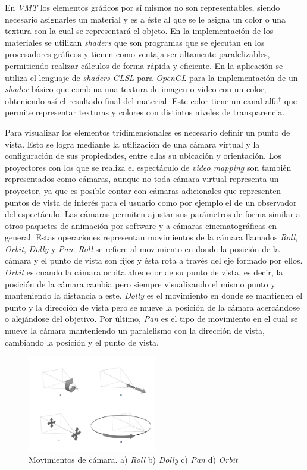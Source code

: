 En \emph{VMT} los elementos gráficos por sí mismos no son representables, siendo necesario asignarles un material y es a éste al que se le asigna un color o una textura con la cual se representará el objeto.
En la implementación de los materiales se utilizan \emph{shaders} que son programas que se ejecutan en los procesadores gráficos y tienen como ventaja ser altamente paralelizables, permitiendo realizar cálculos de forma rápida y eficiente. En la aplicación se utiliza el lenguaje de \emph{shaders} \emph{GLSL}\cite{GLSL} para \emph{OpenGL} para la implementación de un \emph{shader} básico que combina una textura de imagen o video con un color, obteniendo así el resultado final del material. Este color tiene un canal alfa$^\dagger$ que permite representar texturas y colores con distintos niveles de transparencia.

Para visualizar los elementos tridimensionales es necesario definir un punto de vista. Esto se logra mediante la utilización de una cámara virtual y la configuración de sus propiedades, entre ellas su ubicación y orientación. Los proyectores con los que se realiza el espectáculo de \emph{video mapping} son también representados como cámaras, aunque no toda cámara virtual representa un proyector, ya que es posible contar con cámaras adicionales que representen puntos de vista de interés para el usuario como por ejemplo el de un observador del espectáculo.
Las cámaras permiten ajustar sus parámetros de forma similar a otros paquetes de animación por software y a cámaras cinematográficas en general. Estas operaciones representan movimientos de la cámara llamados \emph{Roll}, \emph{Orbit}, \emph{Dolly} y \emph{Pan}.
\emph{Roll} se refiere al movimiento en donde la posición de la cámara y el punto de vista son fijos y ésta rota a través del eje formado por ellos.
\emph{Orbit} es cuando la cámara orbita alrededor de su punto de vista, es decir, la posición de la cámara cambia pero siempre visualizando el mismo punto y manteniendo la distancia a este.
\emph{Dolly} es el movimiento en donde se mantienen el punto y la dirección de vista pero se mueve la posición de la cámara acercándose o alejándose del objetivo.
Por último, \emph{Pan} es el tipo de movimiento en el cual se mueve la cámara manteniendo un paralelismo con la dirección de vista, cambiando la posición y el punto de vista.

\begin{figure}[H]
  \centering
    \includegraphics[width=0.5\textwidth]{./Cap5_vmt/vmtengine-cameramove.png}
  \caption[Imagen propia.]{Movimientos de cámara. a) \emph{Roll} b) \emph{Dolly} c) \emph{Pan} d) \emph{Orbit}}
  \label{fig:VMT-CameraMove}
\end{figure}

